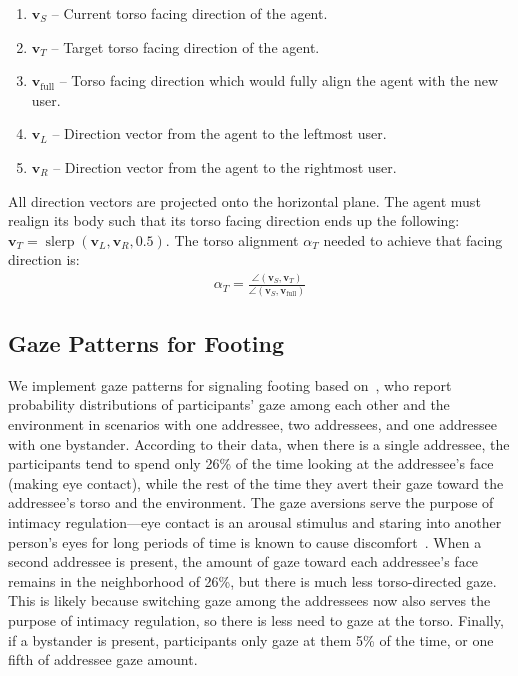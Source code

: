 \begin{enumerate}
\item $\mathbf{v}_S$ -- Current torso facing direction of the agent.
\item $\mathbf{v}_T$ -- Target torso facing direction of the agent.
\item $\mathbf{v}_\mathrm{full}$ -- Torso facing direction which would fully align the agent with the new user.
\item $\mathbf{v}_L$ -- Direction vector from the agent to the leftmost user.
\item $\mathbf{v}_R$ -- Direction vector from the agent to the rightmost user.
\end{enumerate}

All direction vectors are projected onto the horizontal plane. The agent must realign its body such that its torso facing direction ends up the following: $\mathbf{v}_T = \mathop{slerp}(\mathbf{v}_L, \mathbf{v}_R, 0.5)$. The torso alignment $\alpha_T$ needed to achieve that facing direction is:
%
\begin{align} \label{eq:FTorsoAlign}
\alpha_T = \frac{\angle(\mathbf{v}_S, \mathbf{v}_T)}{\angle(\mathbf{v}_S, \mathbf{v}_\mathrm{full})}
\end{align}
%

\subsection{Gaze Patterns for Footing}

We implement gaze patterns for signaling footing based on~\citet{mutlu2012conversational}, who report probability distributions of participants' gaze among each other and the environment in scenarios with one addressee, two addressees, and one addressee with one bystander. According to their data, when there is a single addressee, the participants tend to spend only 26\% of the time looking at the addressee's face (making eye contact), while the rest of the time they avert their gaze toward the addressee's torso and the environment. The gaze aversions serve the purpose of intimacy regulation---eye contact is an arousal stimulus and staring into another person's eyes for long periods of time is known to cause discomfort~\citep{argyle1976gaze}. When a second addressee is present, the amount of gaze toward each addressee's face remains in the neighborhood of 26\%, but there is much less torso-directed gaze. This is likely because switching gaze among the addressees now also serves the purpose of intimacy regulation, so there is less need to gaze at the torso. Finally, if a bystander is present, participants only gaze at them 5\% of the time, or one fifth of addressee gaze amount.

